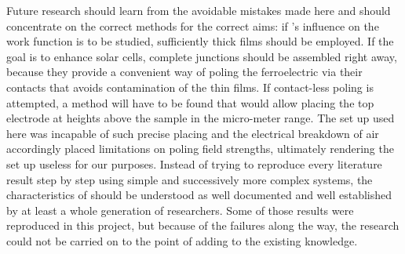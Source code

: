 Future research should learn from the avoidable mistakes made here and should concentrate on the correct methods for the correct aims: if \pvdf{}'s influence on the work function is to be studied, sufficiently thick films should be employed. If the goal is to enhance solar cells, complete junctions should be assembled right away, because they provide a convenient way of poling the ferroelectric via their contacts that avoids contamination of the thin films. If contact-less poling is attempted, a method will have to be found that would allow placing the top electrode at heights above the sample in the micro-meter range. The set up used here was incapable of such precise placing and the electrical breakdown of air accordingly placed limitations on poling field strengths, ultimately rendering the set up useless for our purposes. Instead of trying to reproduce every literature result step by step using simple and successively more complex systems, the characteristics of \pvdf{} should be understood as well documented and well established by at least a whole generation of researchers. Some of those results were reproduced in this project, but because of the failures along the way, the research could not be carried on to the point of adding to the existing knowledge.